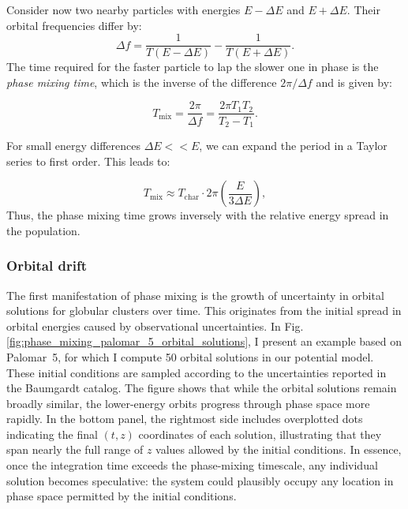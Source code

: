         Consider now two nearby particles with energies $E - \Delta E$ and $ E + \Delta E $. Their orbital frequencies differ by:
        \begin{equation}
            \Delta f = \frac{1}{T( E - \Delta E)} - \frac{1}{T(E + \Delta E)}.
        \end{equation}
        The time required for the faster particle to lap the slower one in phase is the \textit{phase mixing time}, which is the inverse of the difference $2\pi / \Delta f$ and is given by:

        \begin{equation}
            T_\mathrm{mix} = \frac{2\pi}{\Delta f} = \frac{2\pi T_1 T_2}{T_2 - T_1}.
        \end{equation}

        For small energy differences \( \Delta E << E \), we can expand the period in a Taylor series to first order. This leads to:

        \begin{equation}
            T_\mathrm{mix} \approx T_\mathrm{char} \cdot 2\pi \left( \frac{E}{3 \Delta E} \right),
            \label{EQ:phase_mixing}
        \end{equation}
        Thus, the phase mixing time grows inversely with the relative energy spread in the population.

        \subsubsection{Orbital drift}
            The first manifestation of phase mixing is the growth of uncertainty in orbital solutions for globular clusters over time. This originates from the initial spread in orbital energies caused by observational uncertainties. In Fig.\ref{fig:phase_mixing_palomar_5_orbital_solutions}, I present an example based on Palomar~5, for which I compute 50 orbital solutions in our potential model. These initial conditions are sampled according to the uncertainties reported in the Baumgardt catalog. The figure shows that while the orbital solutions remain broadly similar, the lower-energy orbits progress through phase space more rapidly. In the bottom panel, the rightmost side includes overplotted dots indicating the final $(t, z)$ coordinates of each solution, illustrating that they span nearly the full range of $z$ values allowed by the initial conditions. In essence, once the integration time exceeds the phase-mixing timescale, any individual solution becomes speculative: the system could plausibly occupy any location in phase space permitted by the initial conditions.


